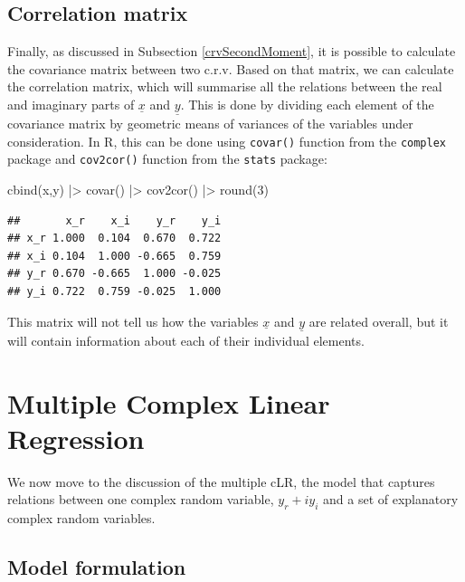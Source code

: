 \documentclass[
]{book}
\newenvironment{Shaded}{\begin{snugshade}}{\end{snugshade}}
\newcommand{\DecValTok}[1]{\textcolor[rgb]{0.00,0.00,0.81}{#1}}
\newcommand{\FunctionTok}[1]{\textcolor[rgb]{0.00,0.00,0.00}{#1}}
\newcommand{\NormalTok}[1]{#1}
\newcommand{\SpecialCharTok}[1]{\textcolor[rgb]{0.00,0.00,0.00}{#1}}
\begin{document}
\hypertarget{correlation-matrix}{%
\section{Correlation matrix}\label{correlation-matrix}}

Finally, as discussed in Subsection \ref{crvSecondMoment}, it is possible to calculate the covariance matrix between two c.r.v. Based on that matrix, we can calculate the correlation matrix, which will summarise all the relations between the real and imaginary parts of \(\underline{x}\) and \(\underline{y}\). This is done by dividing each element of the covariance matrix by geometric means of variances of the variables under consideration. In R, this can be done using \texttt{covar()} function from the \texttt{complex} package and \texttt{cov2cor()} function from the \texttt{stats} package:

\begin{Shaded}
\begin{Highlighting}[]
\FunctionTok{cbind}\NormalTok{(x,y) }\SpecialCharTok{|\textgreater{}} \FunctionTok{covar}\NormalTok{() }\SpecialCharTok{|\textgreater{}} \FunctionTok{cov2cor}\NormalTok{() }\SpecialCharTok{|\textgreater{}} \FunctionTok{round}\NormalTok{(}\DecValTok{3}\NormalTok{)}
\end{Highlighting}
\end{Shaded}

\begin{verbatim}
##       x_r    x_i    y_r    y_i
## x_r 1.000  0.104  0.670  0.722
## x_i 0.104  1.000 -0.665  0.759
## y_r 0.670 -0.665  1.000 -0.025
## y_i 0.722  0.759 -0.025  1.000
\end{verbatim}

This matrix will not tell us how the variables \(\underline{x}\) and \(\underline{y}\) are related overall, but it will contain information about each of their individual elements.

\hypertarget{multipleCLR}{%
\chapter{Multiple Complex Linear Regression}\label{multipleCLR}}

We now move to the discussion of the multiple cLR, the model that captures relations between one complex random variable, \(y_r + i y_i\) and a set of explanatory complex random variables.

\hypertarget{model-formulation}{%
\section{Model formulation}\label{model-formulation}}
\end{document}

